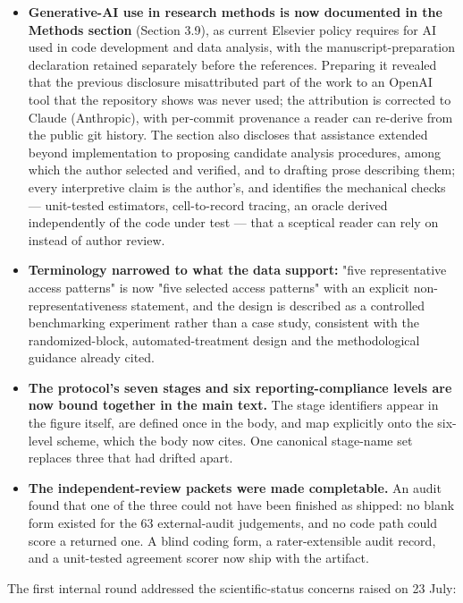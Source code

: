 \documentclass[11pt,a4paper]{article}
\begin{document}
\begin{itemize}
  \item \textbf{Generative-AI use in research methods is now documented in the Methods section} (Section 3.9), as current Elsevier policy requires for AI used in code development and data analysis, with the manuscript-preparation declaration retained separately before the references. Preparing it revealed that the previous disclosure misattributed part of the work to an OpenAI tool that the repository shows was never used; the attribution is corrected to Claude (Anthropic), with per-commit provenance a reader can re-derive from the public git history. The section also discloses that assistance extended beyond implementation to proposing candidate analysis procedures, among which the author selected and verified, and to drafting prose describing them; every interpretive claim is the author's, and identifies the mechanical checks --- unit-tested estimators, cell-to-record tracing, an oracle derived independently of the code under test --- that a sceptical reader can rely on instead of author review.
  \item \textbf{Terminology narrowed to what the data support:} "five representative access patterns" is now "five selected access patterns" with an explicit non-representativeness statement, and the design is described as a controlled benchmarking experiment rather than a case study, consistent with the randomized-block, automated-treatment design and the methodological guidance already cited.
  \item \textbf{The protocol's seven stages and six reporting-compliance levels are now bound together in the main text.} The stage identifiers appear in the figure itself, are defined once in the body, and map explicitly onto the six-level scheme, which the body now cites. One canonical stage-name set replaces three that had drifted apart.
  \item \textbf{The independent-review packets were made completable.} An audit found that one of the three could not have been finished as shipped: no blank form existed for the 63 external-audit judgements, and no code path could score a returned one. A blind coding form, a rater-extensible audit record, and a unit-tested agreement scorer now ship with the artifact.
\end{itemize}

The first internal round addressed the scientific-status concerns raised on 23 July:
\end{document}
